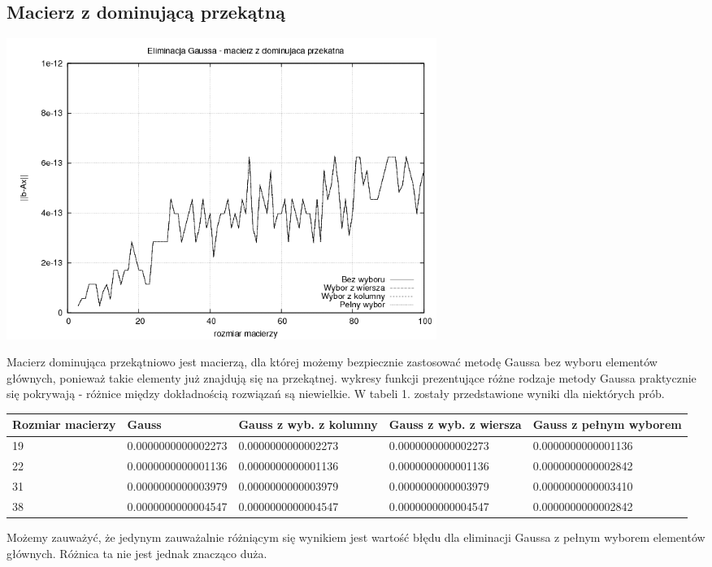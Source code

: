 \documentclass[a4paper,10pt]{article}
\begin{document}
    \subsection{Macierz z dominującą przekątną}
        \begin{center}
            \includegraphics[width=140mm]{dominating_plot.png}
        \end{center}
        Macierz dominująca przekątniowo jest macierzą, dla której możemy bezpiecznie zastosować metodę Gaussa bez wyboru elementów głównych, ponieważ takie elementy już znajdują się na przekątnej. wykresy funkcji prezentujące różne rodzaje metody Gaussa praktycznie się pokrywają - różnice między dokładnością rozwiązań są niewielkie. W tabeli 1. zostały przedstawione wyniki dla niektórych prób.
        \begin{center}
            \begin{tabular}{ | l | l | l | l | p{3cm} | }
            \hline
            Rozmiar macierzy & Gauss & Gauss z wyb. z kolumny & Gauss z wyb. z wiersza & Gauss z pełnym wyborem \\ \hline
            19 & 0.0000000000002273 & 0.0000000000002273 & 0.0000000000002273 & 0.0000000000001136 \\ \hline
            22 & 0.0000000000001136 & 0.0000000000001136 & 0.0000000000001136 & 0.0000000000002842 \\ \hline
            31 & 0.0000000000003979 & 0.0000000000003979 & 0.0000000000003979 & 0.0000000000003410 \\ \hline
            38 & 0.0000000000004547 & 0.0000000000004547 & 0.0000000000004547 & 0.0000000000002842 \\ \hline
            \end{tabular}
        \end{center}
        Możemy zauważyć, że jedynym zauważalnie różniącym się wynikiem jest wartość błędu dla eliminacji Gaussa z pełnym wyborem elementów głównych. Różnica ta nie jest jednak znacząco duża.
\end{document}
